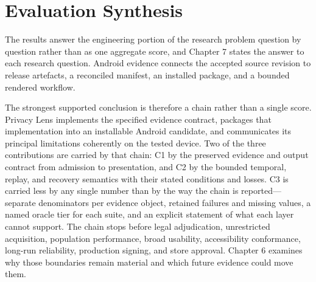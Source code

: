 \section{Evaluation Synthesis}

The results answer the engineering portion of the research problem question by question rather than as one aggregate score, and Chapter 7 states the answer to each research question. Android evidence connects the accepted source revision to release artefacts, a reconciled manifest, an installed package, and a bounded rendered workflow.

The strongest supported conclusion is therefore a chain rather than a single score. Privacy Lens implements the specified evidence contract, packages that implementation into an installable Android candidate, and communicates its principal limitations coherently on the tested device. Two of the three contributions are carried by that chain: C1 by the preserved evidence and output contract from admission to presentation, and C2 by the bounded temporal, replay, and recovery semantics with their stated conditions and losses. C3 is carried less by any single number than by the way the chain is reported---separate denominators per evidence object, retained failures and missing values, a named oracle tier for each suite, and an explicit statement of what each layer cannot support. The chain stops before legal adjudication, unrestricted acquisition, population performance, broad usability, accessibility conformance, long-run reliability, production signing, and store approval. Chapter 6 examines why those boundaries remain material and which future evidence could move them.
